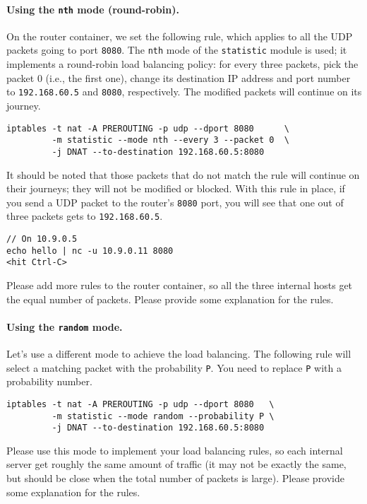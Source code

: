 \paragraph{Using the \texttt{nth} mode (round-robin).}
On the router container, we set the following rule, which applies 
to all the UDP packets going to port \texttt{8080}. 
The \texttt{nth} mode of the \texttt{statistic} module is used; 
it implements a round-robin load balancing policy: for every
three packets, pick the packet 0 (i.e., the first one), 
change its destination IP address and port number to 
\texttt{192.168.60.5}  and \texttt{8080}, respectively.  
The modified packets will continue on its journey.

\begin{lstlisting}
iptables -t nat -A PREROUTING -p udp --dport 8080      \
         -m statistic --mode nth --every 3 --packet 0  \
         -j DNAT --to-destination 192.168.60.5:8080
\end{lstlisting}

It should be noted that those packets that do not match
the rule will continue on their journeys; they will
not be modified or blocked. With this rule in place, 
if you send a UDP packet to the router's \texttt{8080} port,  
you will see that one out of three packets gets to 
\texttt{192.168.60.5}. 

\begin{lstlisting}
// On 10.9.0.5
echo hello | nc -u 10.9.0.11 8080
<hit Ctrl-C>
\end{lstlisting}
 

Please add more rules to the router container, 
so all the three internal hosts get the equal 
number of packets. 
Please provide some explanation for the rules. 


\paragraph{Using the \texttt{random} mode.}
Let's use a different mode to achieve the load balancing. The following 
rule will select a matching packet with the probability \texttt{P}.  
You need to replace \texttt{P} with a probability number.

\begin{lstlisting}
iptables -t nat -A PREROUTING -p udp --dport 8080   \
         -m statistic --mode random --probability P \
         -j DNAT --to-destination 192.168.60.5:8080
\end{lstlisting}

Please use this mode to implement your load balancing 
rules, so each internal server get roughly the 
same amount of traffic (it may not be exactly the same, 
but should be close when the total number of packets is large). 
Please provide some explanation for the rules. 




